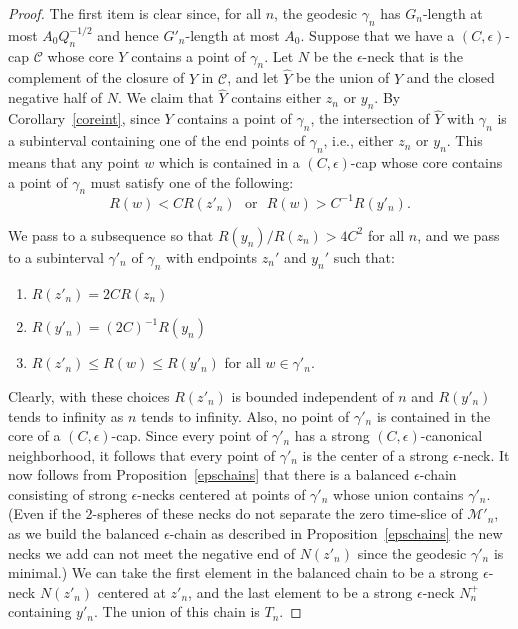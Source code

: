 \begin{proof}
\sketch
The first item is clear since, for all $n$, the geodesic $\gamma_n$
has $G_n$-length at most $A_0Q_n^{-1/2}$ and hence $G'_n$-length at
most $A_0$. Suppose that we have a $(C,\epsilon)$-cap ${\mathcal C}$
whose core $Y$ contains a point of $\gamma_n$. Let $N$ be the
$\epsilon$-neck that is the complement of the closure of $Y$ in
${\mathcal C}$, and let $\widehat Y$ be the union of $Y$ and the
closed negative half of $N$. We claim that $\widehat Y$ contains
either $z_n$ or $y_n$. By Corollary~\ref{coreint}, since $Y$
contains a point of $\gamma_n$, the intersection of $\widehat Y$
with $\gamma_n$ is a subinterval containing one of the end points of
$\gamma_n$, i.e., either $z_n$ or $y_n$. This means that any point
$w$  which is contained in a $(C,\epsilon)$-cap whose core contains
a point of $\gamma_n$ must satisfy one of the following:
$$R(w)< CR(z'_n)\ \ \ \text{or}\ \ \ R(w)> C^{-1}R(y'_n).$$

We pass to a subsequence so that $R(y_n)/R(z_n)>4C^2$ for all $n$,
and we pass to a subinterval $\gamma'_n$ of $\gamma_n$ with
endpoints $z_n'$ and $y_n'$ such that:
\begin{enumerate}
\item[(1)] $R(z'_n)=2CR(z_n)$
\item[(2)] $R(y'_n)=(2C)^{-1}R(y_n)$
\item[(3)] $R(z'_n)\le R(w)\le R(y'_n)$ for all $w\in \gamma'_n$.
\end{enumerate}
Clearly, with these choices $R(z'_n)$ is bounded independent of $n$
and $R(y'_n)$ tends to infinity as $n$ tends to infinity. Also, no
point of $\gamma'_n$ is contained in the core of a
$(C,\epsilon)$-cap. Since every point of $\gamma'_n$ has a strong
$(C,\epsilon)$-canonical neighborhood, it follows that every point
of $\gamma'_n$ is the center of a strong $\epsilon$-neck. It now
follows from Proposition~\ref{epschains} that there is a balanced
$\epsilon$-chain consisting of strong $\epsilon$-necks centered at
points of $\gamma'_n$ whose union contains $\gamma'_n$. (Even if the
$2$-spheres of these necks do not separate the zero time-slice of
${\mathcal M}'_n$, as we build the balanced $\epsilon$-chain as
described in Proposition~\ref{epschains} the new necks we add can
not meet the negative end of $N(z'_n)$ since the geodesic
$\gamma'_n$ is minimal.) We can take the first element in the
balanced chain to be a strong $\epsilon$-neck $N(z'_n)$ centered at
$z'_n$, and the last element to be a strong $\epsilon$-neck $N^+_n$
containing $y'_n$. The union of this chain is $T_n$.


\end{proof}
